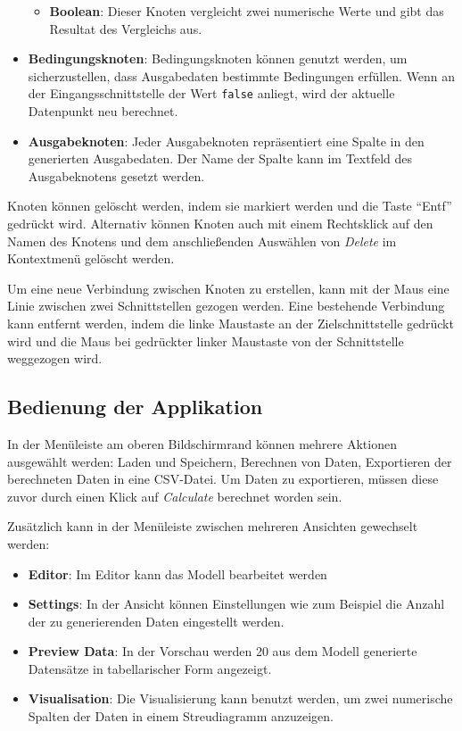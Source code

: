 \begin{itemize}
\begin{itemize}
        \item \textbf{Boolean}: Dieser Knoten vergleicht zwei numerische Werte und gibt das Resultat des Vergleichs aus.
    \end{itemize}
    \item \textbf{Bedingungsknoten}: Bedingungsknoten können genutzt werden, um sicherzustellen, dass Ausgabedaten bestimmte Bedingungen erfüllen. Wenn an der Eingangsschnittstelle der Wert \texttt{false} anliegt, wird der aktuelle Datenpunkt neu berechnet.
    \item \textbf{Ausgabeknoten}: Jeder Ausgabeknoten repräsentiert eine Spalte in den generierten Ausgabedaten. Der Name der Spalte kann im Textfeld des Ausgabeknotens gesetzt werden.
\end{itemize}

Knoten können gelöscht werden, indem sie markiert werden und die Taste \enquote{Entf} gedrückt wird. Alternativ können Knoten auch mit einem Rechtsklick auf den Namen des Knotens und dem anschließenden Auswählen von \textit{Delete} im Kontextmenü gelöscht werden.

Um eine neue Verbindung zwischen Knoten zu erstellen, kann mit der Maus eine Linie zwischen zwei Schnittstellen gezogen werden. Eine bestehende Verbindung kann entfernt werden, indem die linke Maustaste an der Zielschnittstelle gedrückt wird und die Maus bei gedrückter linker Maustaste von der Schnittstelle weggezogen wird.

\subsection*{Bedienung der Applikation}

In der Menüleiste am oberen Bildschirmrand können mehrere Aktionen ausgewählt werden: Laden und Speichern, Berechnen von Daten, Exportieren der berechneten Daten in eine \ac{CSV}-Datei. Um Daten zu exportieren, müssen diese zuvor durch einen Klick auf \textit{Calculate} berechnet worden sein.

Zusätzlich kann in der Menüleiste zwischen mehreren Ansichten gewechselt werden:
\begin{itemize}
    \item \textbf{Editor}: Im Editor kann das Modell bearbeitet werden
    \item \textbf{Settings}: In der Ansicht können Einstellungen wie zum Beispiel die Anzahl der zu generierenden Daten eingestellt werden.
    \item \textbf{Preview Data}: In der Vorschau werden 20 aus dem Modell generierte Datensätze in tabellarischer Form angezeigt.
    \item \textbf{Visualisation}: Die Visualisierung kann benutzt werden, um zwei numerische Spalten der Daten in einem Streudiagramm anzuzeigen.
\end{itemize}